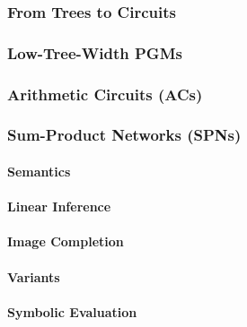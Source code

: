 			\subsubsection{From Trees to Circuits} %

			\subsubsection{Low-Tree-Width PGMs} %

			\subsubsection{Arithmetic Circuits (ACs)} %

			\subsubsection{Sum-Product Networks (SPNs)} %

				\paragraph{Semantics} %

				\paragraph{Linear Inference} %

				\paragraph{Image Completion} %

				\paragraph{Variants} %

				\paragraph{Symbolic Evaluation} %


